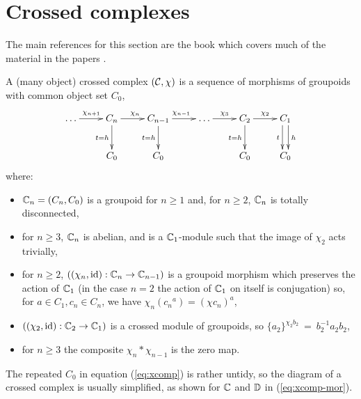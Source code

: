 
\section{Crossed complexes}

The main references for this section are the book \cite{brow:siv} 
which covers much of the material in the papers 
\cite{brow:gilb,brow:higg:1987,brow:higg:1989,brow:higg:1990,brow:higg:1991}. 

\begin{defn}
A (many object) crossed complex $(\mathcal{C},\chi)$ is a sequence of morphisms 
of groupoids with common object set $C_0$,
\begin{equation} \label{eq:xcomp} 
\xymatrix{ 
  \ldots  \ar[r]^{\chi_{n+1}} 
    &  C_n  \ar[r]^{\chi_n} \ar[d]_{t=h} 
       &  C_{n-1}  \ar[r]^{\chi_{n-1}} \ar[d]_{t=h} 
          & \ldots \ar[r]^{\chi_3} 
             &  C_2  \ar[r]^{\chi_2} \ar[d]_{t=h} 
                &  C_1 \ar[d]<+0.7ex>^h \ar[d]<-0.7ex>_t  \\
    &  C_0 
       &  C_0 
          &  &  C_0 
                &  C_0 \\
}
\end{equation}
where: 
\begin{itemize}
\item
$\mathbb{C}_n = (C_n,C_0)$ is a groupoid for $n \geqslant 1$ and, 
for $n \geqslant 2$, $\mathbb{C}_n$ is totally disconnected, 
\item
for $n \geqslant 3$, $\mathbb{C}_n$ is abelian, and is a $\mathbb{C}_1$-module 
such that the image of $\chi_2$ acts trivially,   
\item
for $n \geqslant 2$, $((\chi_n,\mathrm{id}) : \mathbb{C}_n \to \mathbb{C}_{n-1})$  
is a groupoid morphism which preserves the action of $\mathbb{C}_1$ 
(in the case $n=2$ the action of $\mathbb{C}_1$ on itself is conjugation) so, 
for $a \in C_1, c_n \in C_n$, we have $\chi_n({c_n}^a) = (\chi c_n)^a$, 
\item
$((\chi_2,\mathrm{id}) : \mathbb{C}_2 \to \mathbb{C}_1)$ is a crossed module of groupoids, 
so $\{a_2\}^{\chi_2b_2} ~=~ b_2^{-1}a_2b_2$, 
\item
for $n \geqslant 3$ the composite $\chi_n*\chi_{n-1}$ is the zero map. 
\end{itemize}
\end{defn}

The repeated $C_0$ in equation (\ref{eq:xcomp}) is rather untidy, 
so the diagram of a crossed complex is usually simplified, 
as shown for $\mathbb{C}$ and $\mathbb{D}$ in (\ref{eq:xcomp-mor}). 

